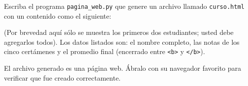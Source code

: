 \begin{certamen}
    \item
      Escriba el programa \texttt{pagina\_web.py}
      que genere un archivo llamado \texttt{curso.html}
      con un contenido como el siguiente:
      
      (Por brevedad aquí sólo se muestra los primeros dos estu\-diantes;
      usted debe agregarlos todos).
      Los datos listados son:
      el nombre completo,
      las notas de los cinco certámenes
      y el promedio final (encerrado entre \verb+<b>+ y \verb+</b>+).

      El archivo generado es una página web.
      Ábralo con su nave\-gador favorito
      para verificar que fue creado correctamente.

\end{certamen}

